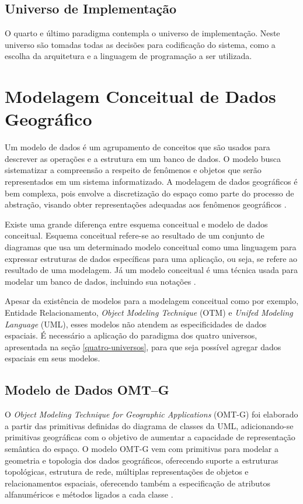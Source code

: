 \subsection{Universo de Implementação}

O quarto e último paradigma contempla o universo de implementação. Neste universo são tomadas todas as decisões para codificação do sistema, como a escolha da arquitetura e a linguagem de programação a ser utilizada.

\section{Modelagem Conceitual de Dados Geográfico}

Um modelo de dados é um agrupamento de conceitos que são usados para descrever as operações e a estrutura em um banco de dados. O modelo busca sistematizar a compreensão a respeito de fenômenos e objetos que serão representados em um sistema informatizado. A modelagem de dados geográficos é bem complexa, pois envolve a discretização do espaço como parte do processo de abstração, visando obter representações adequadas aos fenômenos geográficos \cite{queirozferreira}.

Existe uma grande diferença entre esquema conceitual e modelo de dados conceitual. Esquema conceitual refere-se ao resultado de um conjunto de diagramas que usa um determinado modelo conceitual como uma linguagem para expressar estruturas de dados específicas para uma aplicação, ou seja, se refere ao resultado de uma modelagem. Já um modelo conceitual é uma técnica usada para modelar um banco de dados, incluindo sua notações \cite{queirozferreira}.

Apesar da existência de modelos para a modelagem conceitual como por exemplo, Entidade Relacionamento, \textit{Object Modeling Technique} (OTM) e \textit{Unifed Modeling Language} (UML), esses modelos não atendem as especificidades de dados espaciais. É necessário a aplicação do paradigma dos quatro universos, apresentada na seção \ref{quatro-universos}, para que seja possível agregar dados espaciais em seus modelos.

\subsection{Modelo de Dados OMT–G}
\label{modelo-omtg}

O \textit{Object Modeling Technique for Geographic Applications} (OMT-G) foi elaborado a partir das primitivas definidas do diagrama de classes da UML, adicionando-se primitivas geográficas com o objetivo de aumentar a capacidade de representação semântica do espaço. O modelo OMT-G vem com primitivas para modelar a geometria e topologia dos dados geográficos, oferecendo suporte a estruturas topológicas, estrutura de rede, múltiplas representações de objetos e relacionamentos espaciais, oferecendo também a especificação de atributos alfanuméricos e métodos ligados a cada classe \cite{omtg}.

